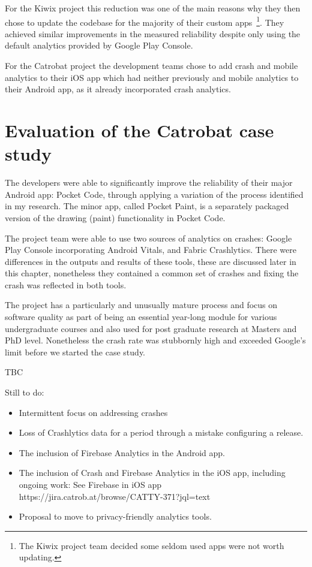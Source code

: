 For the Kiwix project this reduction was one of the main reasons why they then chose to update the codebase for the majority of their custom apps~\footnote{The Kiwix project team decided some seldom used apps were not worth updating.}. They achieved similar improvements in the measured reliability despite only using the default analytics provided by Google Play Console. 

For the Catrobat project the development teams chose to add crash and mobile analytics to their iOS app which had neither previously and mobile analytics to their Android app, as it already incorporated crash analytics.

\section{Evaluation of the Catrobat case study}
The developers were able to significantly improve the reliability of their major Android app: Pocket Code, through applying a variation of the process identified in my research. The minor app, called Pocket Paint, is a separately packaged version of the drawing (paint) functionality in Pocket Code.

The project team were able to use two sources of analytics on crashes: Google Play Console incorporating Android Vitals, and Fabric Crashlytics. There were differences in the outputs and results of these tools, these are discussed later in this chapter, nonetheless they contained a common set of crashes and fixing the crash was reflected in both tools.

The project has a particularly and unusually mature process and focus on software quality as part of being an essential year-long module for various undergraduate courses and also used for post graduate research at Masters and PhD level. Nonetheless the crash rate was stubbornly high and exceeded Google's limit before we started the case study.

TBC

Still to do:
\begin{itemize}
    \item Intermittent focus on addressing crashes
    \item Loss of Crashlytics data for a period through a mistake configuring a release.
    \item The inclusion of Firebase Analytics in the Android app.
    \item The inclusion of Crash and Firebase Analytics in the iOS app, including ongoing work: See Firebase in iOS app https://jira.catrob.at/browse/CATTY-371?jql=text%
    \item Proposal to move to privacy-friendly analytics tools. 
\end{itemize}



